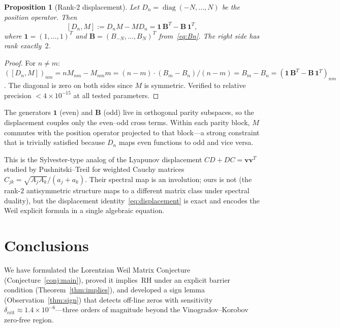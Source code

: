 \documentclass[11pt,a4paper]{article}
\newtheorem{proposition}{Proposition}[section]
\DeclareMathOperator{\diag}{diag}
\begin{document}
\begin{proposition}[Rank-$2$ displacement]\label{prop:displacement}
Let $D_n = \diag(-N, \ldots, N)$ be the position operator. Then
\begin{equation}\label{eq:displacement}
[D_n, M] := D_n M - M D_n = \mathbf{1}\, \mathbf{B}^T - \mathbf{B}\, \mathbf{1}^T,
\end{equation}
where $\mathbf{1} = (1, \ldots, 1)^T$ and $\mathbf{B} = (B_{-N}, \ldots, B_N)^T$ from~\eqref{eq:Bn}. The right side has rank exactly~$2$.
\end{proposition}

\begin{proof}
For $n \neq m$: $([D_n, M])_{nm} = n M_{nm} - M_{nm} m = (n-m) \cdot (B_m - B_n)/(n-m) = B_m - B_n = (\mathbf{1}\, \mathbf{B}^T - \mathbf{B}\, \mathbf{1}^T)_{nm}$. The diagonal is zero on both sides since $M$ is symmetric. Verified to relative precision $< 4 \times 10^{-15}$ at all tested parameters.
\end{proof}

The generators $\mathbf{1}$ (even) and $\mathbf{B}$ (odd) live in orthogonal parity subspaces, so the displacement couples only the even--odd cross terms. Within each parity block, $M$ commutes with the position operator projected to that block---a strong constraint that is trivially satisfied because $D_n$ maps even functions to odd and vice versa.

This is the Sylvester-type analog of the Lyapunov displacement $CD + DC = \mathbf{v}\mathbf{v}^T$ studied by Pushnitski--Treil \cite{PT2025} for weighted Cauchy matrices $C_{jk} = \sqrt{A_j A_k}/(a_j + a_k)$. Their spectral map is an involution; ours is not (the rank-$2$ antisymmetric structure maps to a different matrix class under spectral duality), but the displacement identity~\eqref{eq:displacement} is exact and encodes the Weil explicit formula in a single algebraic equation.

\section{Conclusions}

We have formulated the Lorentzian Weil Matrix Conjecture (Conjecture~\ref{conj:main}), proved it implies~RH under an explicit barrier condition (Theorem~\ref{thm:implies}), and developed a sign lemma (Observation~\ref{thm:sign}) that detects off-line zeros with sensitivity $\delta_{\mathrm{crit}} \approx 1.4 \times 10^{-6}$---three orders of magnitude beyond the Vinogradov--Korobov zero-free region.
\end{document}
